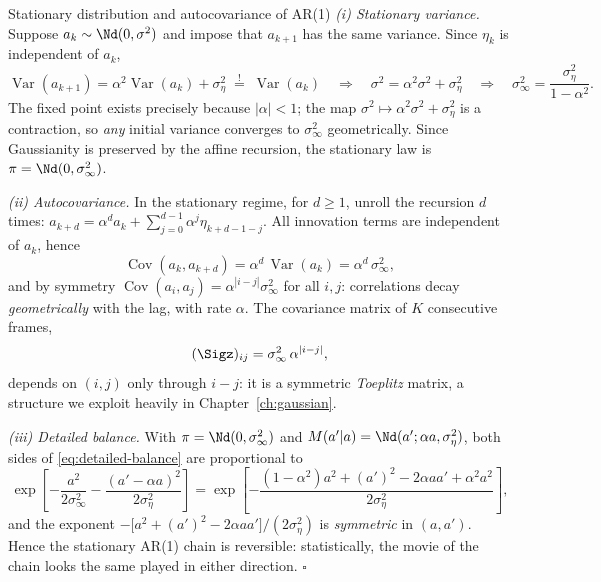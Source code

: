 \begin{toolbox}{Stationary distribution and autocovariance of AR(1)}
\emph{(i) Stationary variance.} Suppose $a_k \sim \Nd(0, \sigma^2)$ and
impose that $a_{k+1}$ has the same variance. Since $\eta_k$ is independent
of $a_k$,
\begin{equation*}
  \operatorname{Var}(a_{k+1})
  = \alpha^2 \operatorname{Var}(a_k) + \sigma_\eta^2
  \;\stackrel{!}{=}\; \operatorname{Var}(a_k)
  \quad\Longrightarrow\quad
  \sigma^2 = \alpha^2 \sigma^2 + \sigma_\eta^2
  \quad\Longrightarrow\quad
  \sigma_\infty^2 = \frac{\sigma_\eta^2}{1 - \alpha^2}.
\end{equation*}
The fixed point exists precisely because $|\alpha| < 1$; the map
$\sigma^2 \mapsto \alpha^2 \sigma^2 + \sigma_\eta^2$ is a contraction, so
\emph{any} initial variance converges to $\sigma_\infty^2$ geometrically.
Since Gaussianity is preserved by the affine recursion, the stationary law is
$\pi = \Nd(0, \sigma_\infty^2)$.

\emph{(ii) Autocovariance.} In the stationary regime, for $d \geq 1$, unroll
the recursion $d$ times:
$a_{k+d} = \alpha^d a_k + \sum_{j=0}^{d-1} \alpha^{j} \eta_{k+d-1-j}$.
All innovation terms are independent of $a_k$, hence
\begin{equation*}
  \operatorname{Cov}(a_k, a_{k+d})
  = \alpha^d\, \operatorname{Var}(a_k)
  = \alpha^d\, \sigma_\infty^2 ,
\end{equation*}
and by symmetry $\operatorname{Cov}(a_i, a_j) = \alpha^{|i-j|}
\sigma_\infty^2$ for all $i, j$: correlations decay \emph{geometrically}
with the lag, with rate $\alpha$. The covariance matrix of $K$ consecutive
frames,
\begin{equation*}
  (\Sigz)_{ij} = \sigma_\infty^2\, \alpha^{|i-j|},
\end{equation*}
depends on $(i,j)$ only through $i - j$: it is a symmetric \emph{Toeplitz}
matrix, a structure we exploit heavily in Chapter~\ref{ch:gaussian}.

\emph{(iii) Detailed balance.} With $\pi = \Nd(0, \sigma_\infty^2)$ and
$M(a'|a) = \Nd(a'; \alpha a, \sigma_\eta^2)$, both sides of
\eqref{eq:detailed-balance} are proportional to
\begin{equation*}
  \exp\!\left[
    -\frac{a^2}{2\sigma_\infty^2}
    -\frac{(a' - \alpha a)^2}{2\sigma_\eta^2}
  \right]
  = \exp\!\left[
    -\frac{(1-\alpha^2) a^2 + (a')^2 - 2\alpha a a' + \alpha^2 a^2}
          {2\sigma_\eta^2}
  \right],
\end{equation*}
and the exponent
$-\big[a^2 + (a')^2 - 2\alpha a a'\big] / (2\sigma_\eta^2)$
is \emph{symmetric} in $(a, a')$. Hence the stationary AR(1) chain is
reversible: statistically, the movie of the chain looks the same played in
either direction. \hfill$\square$
\end{toolbox}

